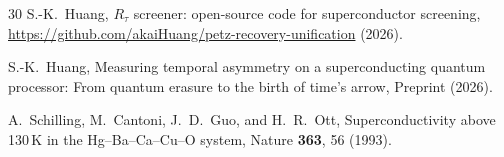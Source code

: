 \documentclass[prl,twocolumn,superscriptaddress,longbibliography,floatfix]{revtex4-2}
\begin{document}
\begin{thebibliography}{30}
S.-K.~Huang,
$R_\tau$ screener: open-source code for superconductor screening,
\url{https://github.com/akaiHuang/petz-recovery-unification} (2026).

S.-K.~Huang,
Measuring temporal asymmetry on a superconducting quantum processor:
From quantum erasure to the birth of time's arrow,
Preprint (2026).

A.~Schilling, M.~Cantoni, J.~D.~Guo, and H.~R.~Ott,
Superconductivity above 130\,K in the Hg--Ba--Ca--Cu--O system,
Nature \textbf{363}, 56 (1993).

\end{thebibliography}
\end{document}
